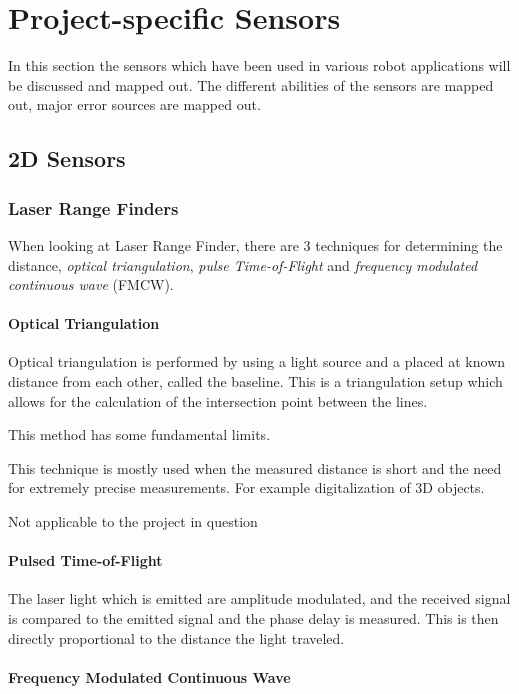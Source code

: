 \section{Project-specific Sensors}
In this section the sensors which have been used in various robot applications will be
discussed and mapped out. The different abilities of the sensors are mapped out, major
error sources are mapped out.


\subsection{2D Sensors}

\subsubsection{Laser Range Finders}


When looking at Laser Range Finder, there are 3 techniques for determining the distance,
\emph{optical triangulation}, \emph{pulse Time-of-Flight} and \emph{frequency modulated
continuous wave} (FMCW). \cite{laser-ranging-critical-review}

\paragraph{Optical Triangulation}
Optical triangulation is performed by using a light source and a placed at known distance
from each other, called the baseline. This is a triangulation setup which
allows for the calculation of the intersection point between the lines. 



This method has some fundamental limits. \cite{laser-ranging-critical-review} 

This technique is mostly used when the measured distance is short and the need for
extremely precise measurements. For example digitalization of 3D objects. 

Not applicable to the project in question


\paragraph{Pulsed Time-of-Flight}
The laser light which is emitted are amplitude modulated, and the received signal is
compared to the emitted signal and the phase delay is measured. This is then directly
proportional to the distance the light traveled. 


\paragraph{Frequency Modulated Continuous Wave}




